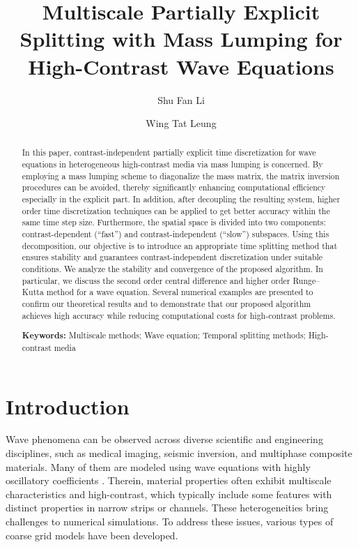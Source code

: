 \documentclass[preprint,12pt]{elsarticle}
\begin{document}
\begin{frontmatter}
\title{Multiscale Partially Explicit Splitting with Mass Lumping for High-Contrast Wave Equations}
\author[WL]{Shu Fan Li}
\author[WL]{Wing Tat Leung }
 

\address[WL]{Department of Mathematics, City University of Hong Kong.}

\begin{abstract}
    In this paper, contrast-independent partially explicit time discretization for wave equations in heterogeneous high-contrast media via mass lumping is concerned. 
    By employing a mass lumping scheme to diagonalize the mass matrix, the matrix inversion procedures can be avoided, thereby significantly enhancing computational efficiency especially in the explicit part. In addition, after decoupling the resulting system, higher order time discretization techniques can be applied to get better accuracy within the same time step size.
    Furthermore, the spatial space is divided into two components: contrast-dependent (“fast”) and contrast-independent (“slow”) subspaces. Using this decomposition, our objective is to introduce an appropriate time splitting method that ensures stability and guarantees contrast-independent discretization under suitable conditions. 
    We analyze the stability and convergence of the proposed algorithm. In particular, we discuss the second order central difference and higher order Runge–Kutta method for a wave equation. Several numerical examples are presented to confirm our theoretical results and to demonstrate that our proposed algorithm achieves high accuracy while reducing computational costs for high-contrast problems.
\par\textbf{Keywords: } Multiscale methods; Wave equation; Temporal splitting methods; High-contrast media
\end{abstract}
\end{frontmatter}
\section{Introduction}
Wave phenomena can be observed across diverse scientific and engineering disciplines, such as medical imaging, seismic inversion, and multiphase composite materials. Many of them are modeled using wave equations with highly oscillatory coefficients 
 \cite{masson2010finite,saenger2007finite,virieux1986p,cheung2021explicit}. Therein, material properties often exhibit multiscale characteristics and high-contrast, which typically include some features with distinct properties in narrow strips or channels. These heterogeneities bring challenges to numerical simulations. To address these issues, various types of coarse grid models have been developed. 
\end{document}
